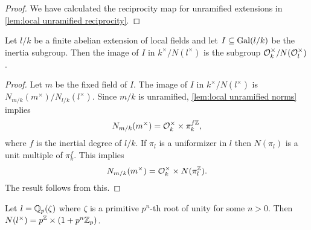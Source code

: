 \begin{proof}
	We have calculated the reciprocity map for unramified extensions
	in \ref{lem:local unramified reciprocity}.
\end{proof}


\begin{lemma} \label{lem:local image inertia}
	Let $l/k$ be a finite abelian extension of local fields and let $I \subseteq \mathrm{Gal}(l/k)$ be
	the inertia subgroup.
	Then the image of $I$ in $k^\times / N(l^\times)$
	is the subgroup ${\mathcal O}_k^\times / N({\mathcal O}_l^\times)$.
\end{lemma}

\begin{proof}
	Let $m$ be the fixed field of $I$. The image of $I$ in $k^\times / N(l^\times)$
	is $N_{m/k}(m^\times) / N_{l/k}(l^\times)$.
	Since $m/k$ is unramified, \ref{lem:local unramified norms} implies
	\[
		N_{m/k}(m^\times) = {\mathcal O}_k^\times \times \pi_k^{f{\mathbb Z}},
	\]
	where $f$ is the inertial degree of $l/k$.
	If $\pi_l$ is a uniformizer in $l$ then $N(\pi_l)$ is a unit multiple of $\pi_k^f$.
	This implies
	\[
		N_{m/k}(m^\times) = {\mathcal O}_k^\times \times N(\pi_l^{{\mathbb Z}}).
	\]
	The result follows from this.
\end{proof}


\begin{example} \label{eg:local cyclotomic norms}
	Let $l = {\mathbb Q}_p(\zeta)$ where $\zeta$ is a primitive $p^n$-th root of unity
	for some $n > 0$.
	Then $N(l^\times) = p^{\mathbb Z} \times (1+p^n {\mathbb Z}_p)$.
\end{example}

